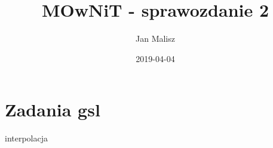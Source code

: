 \documentclass[10pt,a4paper]{article}
\title{MOwNiT - sprawozdanie 2}
\author{Jan Malisz}
\date{2019-04-04}
\begin{document}
  \maketitle
  \thispagestyle{empty}

  \newpage
  \section*{Zadania gsl}\label{sec:ZadaniaGsl}
  {interpolacja}
\end{document}
